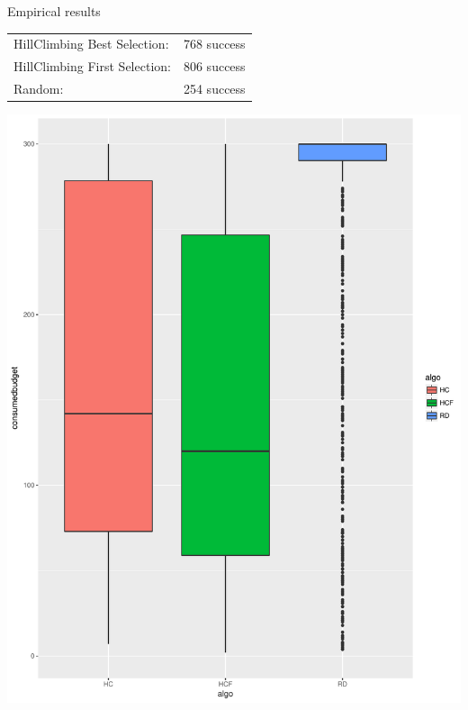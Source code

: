 \documentclass{beamer}
\begin{document}
\begin{frame}{Empirical results}
\begin{center}
\begin{tabular}{ll}
HillClimbing Best Selection: &768 success\\
HillClimbing First Selection: &806 success\\
Random: &254 success\\
\end{tabular}
        \includegraphics[angle=-90,origin=c,scale=0.3]{boxplot_budgets.pdf}
    \end{center}
\end{frame}
\end{document}
